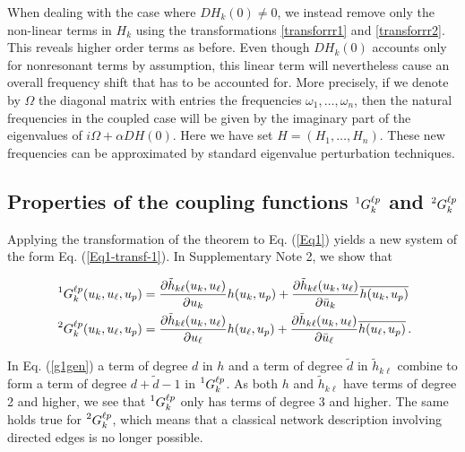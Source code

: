 \documentclass[12pt]{article}
\theoremstyle{plain}
\theoremstyle{definition}
\theoremstyle{remark}
\theoremstyle{remark}
\begin{document}
{{When dealing with the case where $DH_k(0) \not= 0$, we instead remove only the non-linear terms in $H_k$ using the transformations \eqref{transforrr1} and \eqref{transforrr2}. This reveals higher order terms as before. Even though $DH_k(0)$ accounts only for  nonresonant terms by assumption, this linear term will nevertheless cause an overall frequency shift that has to be accounted for. More precisely, if we denote by $\Omega$ the diagonal matrix with entries the frequencies $\omega_1, \dots, \omega_n$,  then the natural frequencies in the coupled case will be given by the imaginary part of the eigenvalues of $i\Omega + \alpha DH(0)$. Here we have set $H = (H_1, \dots, H_n)$. These new frequencies can be approximated by standard eigenvalue perturbation techniques. 
}}


\subsection*{Properties of the coupling functions $\prescript{1}{}{G}_{k}^{\ell p}$ and $\prescript{2}{}{G}_{k}^{\ell p}$}

Applying the transformation of the theorem to Eq. (\ref{Eq1}) yields a new system of the form Eq. (\ref{Eq1-transf-1}). In {Supplementary Note 2}, we show that 
\begin{linenomath}
\begin{align}\label{g1gen}\
\begin{split}
\prescript{1}{}{G}_{k}^{\ell p}(u_k, u_{\ell}, u_p) &= \frac{\partial \tilde{h}_{k \ell}(u_k, u_{\ell})}{\partial u_{k}} h(u_{k}, u_{p}) + \frac{\partial \tilde{h}_{k \ell}(u_k, u_{\ell})}{\partial \bar{u}_{k}} \overline{h(u_{k}, u_p)} \, \\ 
\prescript{2}{}{G}_{k}^{\ell p}(u_k, u_{\ell}, u_p) &= \frac{\partial \tilde{h}_{k \ell}(u_k, u_{\ell})}{\partial u_{\ell}} h(u_{\ell}, u_{p}) + \frac{\partial \tilde{h}_{k \ell}(u_k, u_{\ell})}{\partial \bar{u}_{\ell}} \overline{h(u_{\ell}, u_p)}\, .
\end{split}
\end{align}
\end{linenomath}

In Eq. (\ref{g1gen}) a term of degree $d$ in $h$ and a term of degree $\tilde{d}$ in $ \tilde{h}_{k \ell}$ combine to form a term of degree $d+\tilde{d} - 1$ in $\prescript{1}{}{G}_{k}^{\ell p}$. As both $h$ and  $\tilde{h}_{k \ell}$  have terms of degree 2 and higher,  we see that $\prescript{1}{}{G}_{k}^{\ell p}$ only has terms of degree 3 and higher. The same holds true for $\prescript{2}{}{G}_{k}^{\ell p}$, which means that a classical network description involving directed edges is  no longer possible. 
\end{document}
